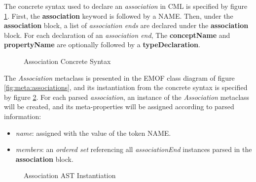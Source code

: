The concrete syntax used to declare an \emph{association} in CML
is specified by figure \ref{fig:stx:association}.
First, the \textbf{association} keyword is followed by a NAME.
Then, under the \textbf{association} block,
a list of \emph{association ends} are declared under the \textbf{association} block.
For each declaration of an \emph{association end},
The \textbf{conceptName} and \textbf{propertyName} are optionally followed by a \textbf{typeDeclaration}.

\begin{figure}
\verbatimfont{\small}

\caption{Association Concrete Syntax}
\label{fig:stx:association}
\end{figure}

The \emph{Association} metaclass is presented 
in the EMOF \cite{mof} class diagram of figure \ref{fig:meta:associations},
and its instantiation from the concrete syntax is specified by figure \ref{fig:ast:associations}.
For each parsed \emph{association},
an instance of the \emph{Association} metaclass will be created,
and its meta-properties will be assigned
according to parsed information:

\begin{itemize}

\item \emph{name}:
assigned with the value of the token NAME.

\item \emph{members}:
an \emph{ordered set} referencing all \emph{associationEnd}
instances parsed in the \textbf{association} block.

\end{itemize}

\begin{figure}
\verbatimfont{\small}

\caption{Association AST Instantiation}
\label{fig:ast:associations}
\end{figure}
